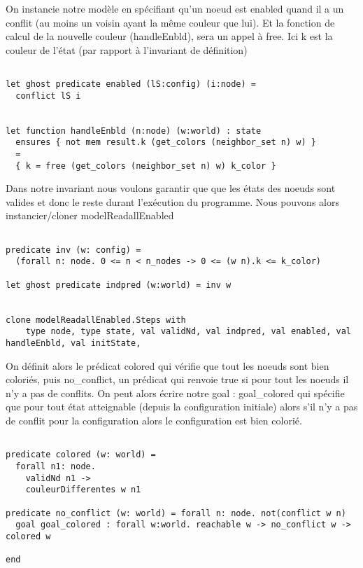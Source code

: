 \documentclass[11pt]{article}
\begin{document}
On instancie notre modèle en spécifiant qu'un noeud est enabled quand il a un conflit (au moins un voisin ayant la même couleur que lui).
Et la fonction de calcul de la nouvelle couleur (handleEnbld), sera un appel à free. 
Ici  k est la couleur de l'état (par rapport à l'invariant de définition)

\begin{verbatim}

let ghost predicate enabled (lS:config) (i:node) =
  conflict lS i


let function handleEnbld (n:node) (w:world) : state
  ensures { not mem result.k (get_colors (neighbor_set n) w) }
  =
  { k = free (get_colors (neighbor_set n) w) k_color }

\end{verbatim}

Dans notre invariant nous voulons garantir que que les états des noeuds sont valides et donc le reste durant l'exécution du programme.
Nous pouvons alors instancier/cloner modelReadallEnabled

\begin{verbatim}

predicate inv (w: config) =
  (forall n: node. 0 <= n < n_nodes -> 0 <= (w n).k <= k_color)

let ghost predicate indpred (w:world) = inv w


clone modelReadallEnabled.Steps with
    type node, type state, val validNd, val indpred, val enabled, val handleEnbld, val initState,

\end{verbatim}

On définit alors le prédicat colored qui vérifie que tout les noeuds sont bien coloriés, 
puis no\_conflict, un prédicat qui renvoie true si pour tout les noeuds il n'y a pas de conflits.
On peut alors écrire notre goal : goal\_colored qui spécifie que pour tout état atteignable (depuis 
la configuration initiale) alors s'il n'y a pas de conflit pour la configuration alors le configuration 
est bien colorié. 

\begin{verbatim}

predicate colored (w: world) =
  forall n1: node.
    validNd n1 ->
    couleurDifferentes w n1

predicate no_conflict (w: world) = forall n: node. not(conflict w n)
  goal goal_colored : forall w:world. reachable w -> no_conflict w -> colored w

end

\end{verbatim}
\end{document}
